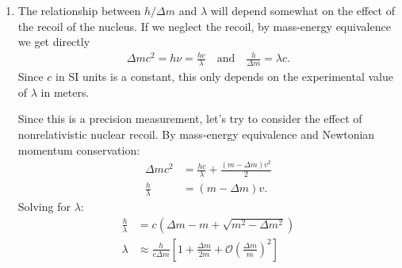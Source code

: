 \documentclass{article}
\theoremstyle{definition}
\newcommand{\lp}{\left(}
\newcommand{\rp}{\right)}
\newcommand{\lb}{\left[}
\newcommand{\rb}{\right]}
\begin{document}
\begin{enumerate}[label=\alph*)]
Since the atomic light-recoil velocities are much smaller than the speed of light, their effect
on the atomic resonance is small and $\nu_1 \sim \nu_2 \sim \nu_0$. By the total conservation of energy:
\begin{align*}
0 + h\nu_1 &= h\nu_2 + \frac{m}{2} \lb v_R(\nu_1) + v_R(\nu_2) \rb^2 \\
h(\nu_1 - \nu_2) &= \frac{m}{2}\lp  \frac{h}{cm} \rp^2 (\nu_1 + \nu_2)^2 \\
\frac{\nu_1 - \nu_2}{(\nu_1 + \nu_2)^2} &= \frac{h}{2mc^2}\\
\frac{1}{2} \frac{\Delta \nu c^2}{\nu_0^2} &= \frac{h}{m}.
\end{align*}
Note the factor of $1/2$ which appears due to the second atomic recoil accompanying the
emission of the photon (see PRL \textbf{70}, 18, 2706 (1993)).


\item The relationship between $h/\Delta m$ and $\lambda$ will depend somewhat on the effect of the recoil of the nucleus. If we neglect the recoil, by mass-energy equivalence we get directly
\begin{align*}
\Delta mc^2 = h\nu = \frac{hc}{\lambda} \quad \text{and} \quad  \frac{h}{\Delta m} = \lambda c.
\end{align*}
Since $c$ in SI units is a constant, this only depends on the experimental value of $\lambda$ in
meters. 

Since this is a precision measurement, let’s try to consider the effect of nonrelativistic
nuclear recoil. By mass-energy equivalence and Newtonian momentum conservation:
\begin{align*}
\Delta mc^2 &= \frac{hc}{\lambda} + \frac{(m - \Delta m) v^2}{2}\\
\frac{h}{\lambda} &= (m - \Delta m)v.
\end{align*}
Solving for $\lambda$:
\begin{align*}
\frac{h}{\lambda} &= c\lp \Delta m -m + \sqrt{m^2 - \Delta m^2}\rp \\
\lambda &\approx \frac{h}{c\Delta m} \lb 1 + \frac{\Delta m}{2m } + \mathcal{O}\lp \frac{\Delta m}{m} \rp^2 \rb
\end{align*}


\end{enumerate}
\end{document}
